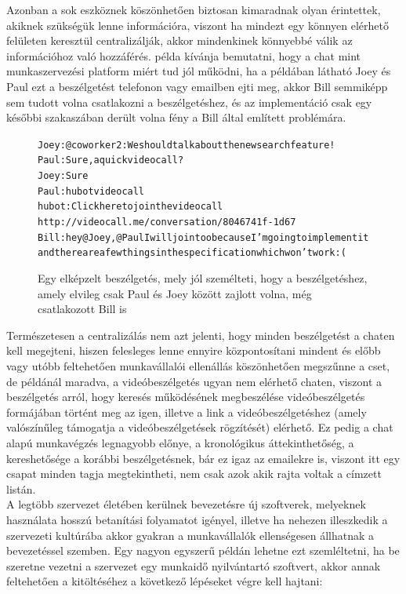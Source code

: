 Azonban a sok eszköznek köszönhetően biztosan kimaradnak olyan érintettek, akiknek szükségük lenne információra, viszont ha mindezt egy könnyen elérhető felületen keresztül centralizálják, akkor mindenkinek könnyebbé válik az információhoz való hozzáférés.  példa kívánja bemutatni, hogy a chat mint munkaszervezési platform miért tud jól működni, ha a példában látható Joey és Paul ezt a beszélgetést telefonon vagy emailben ejti meg, akkor Bill semmiképp sem tudott volna csatlakozni a beszélgetéshez, és az implementáció csak egy későbbi szakaszában derült volna fény a Bill által említett problémára.

\begin{figure}
  \begin{alltt}
Joey: @coworker2: We should talk about the new search feature!
Paul: Sure, a quick videocall?
Joey: Sure
Paul: hubot videocall
hubot: Click here to join the video call
       http://videocall.me/conversation/8046741f-1d67
Bill: hey @Joey, @Paul I will join too because I'm going to implement it 
      and there are a few things in the specification which won't work :(
  \end{alltt}
  \caption[DUMMY]%
    {Egy elképzelt beszélgetés, mely jól személteti, hogy a beszélgetéshez, amely elvileg csak Paul és Joey között zajlott volna, még csatlakozott Bill is}%
    \label{lst:search_feature_call}
\end{figure}

Természetesen a centralizálás nem azt jelenti, hogy minden beszélgetést a chaten kell megejteni, hiszen felesleges lenne ennyire központosítani mindent és előbb vagy utóbb feltehetően munkavállalói ellenállás köszönhetően megszűnne a cset, de  példánál maradva, a videóbeszélgetés ugyan nem elérhető chaten, viszont a beszélgetés arról, hogy keresés működésének megbeszélése videóbeszélgetés formájában történt meg az igen, illetve a link a videóbeszélgetéshez (amely valószínűleg támogatja a videóbeszélgetések rögzítését) elérhető. Ez pedig a chat alapú munkavégzés legnagyobb előnye, a kronológikus áttekinthetőség, a kereshetősége a korábbi beszélgetésnek, bár ez igaz az emailekre is, viszont itt egy csapat minden tagja megtekintheti, nem csak azok akik rajta voltak a címzett listán.\\

A legtöbb szervezet életében kerülnek bevezetésre új szoftverek, melyeknek használata hosszú betanítási folyamatot igényel, illetve ha nehezen illeszkedik a szervezeti kultúrába akkor gyakran a munkavállalók ellenségesen állhatnak a bevezetéssel szemben. Egy nagyon egyszerű példán lehetne ezt szemléltetni, ha be szeretne vezetni a szervezet egy munkaidő nyilvántartó szoftvert, akkor annak feltehetően a kitöltéséhez a következő lépéseket végre kell hajtani:

